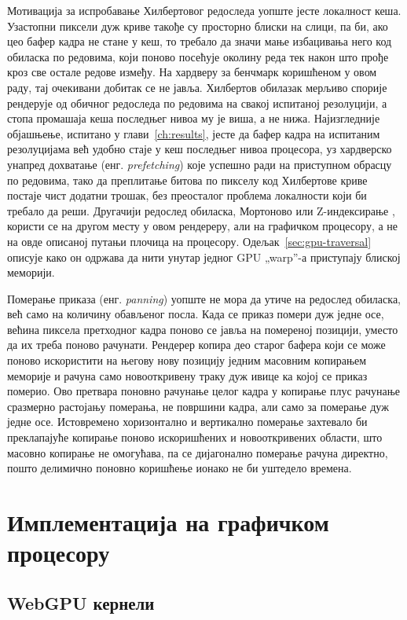 \documentclass[serbian]{ftndiplomski}
\begin{document}
Мотивација за испробавање Хилбертовог редоследа уопште јесте локалност кеша.
Узастопни пиксели дуж криве такође су просторно блиски на слици, па би, ако цео бафер
кадра не стане у кеш, то требало да значи мање избацивања него код обиласка по
редовима, који поново посећује околину реда тек након што прође кроз све остале редове
између. На хардверу за бенчмарк коришћеном у овом раду, тај очекивани добитак се не
јавља. Хилбертов обилазак мерљиво спорије рендерује од обичног редоследа по редовима
на свакој испитаној резолуцији, а стопа промашаја кеша последњег нивоа му је виша, а
не нижа. Најизгледније објашњење, испитано у глави~\ref{ch:results}, јесте да бафер
кадра на испитаним резолуцијама већ удобно стаје у кеш последњег нивоа процесора, уз
хардверско унапред дохватање (енг. \emph{prefetching}) које успешно ради на приступном
обрасцу по редовима, тако да преплитање битова по пикселу код Хилбертове криве постаје
чист додатни трошак, без преосталог проблема локалности који би требало да реши.
Другачији редослед обиласка, Мортоново или Z-индексирање \cite{morton1966}, користи се
на другом месту у овом рендереру, али на графичком процесору, а не на овде описаној
путањи плочица на процесору. Одељак~\ref{sec:gpu-traversal} описује како он одржава да
нити унутар једног GPU „warp''-а приступају блиској меморији.

Померање приказа (енг. \emph{panning}) уопште не мора да утиче на редослед обиласка, већ
само на количину обављеног посла. Када се приказ помери дуж једне осе, већина пиксела
претходног кадра поново се јавља на помереној позицији, уместо да их треба поново
рачунати. Рендерер копира део старог бафера који се може поново искористити на његову
нову позицију једним масовним копирањем меморије и рачуна само новооткривену траку
дуж ивице ка којој се приказ померио. Ово претвара поновно рачунање целог кадра у копирање плус рачунање сразмерно
растојању померања, не површини кадра, али само за померање дуж једне осе.
Истовремено хоризонтално и вертикално померање захтевало би преклапајуће копирање
поново искоришћених и новооткривених области, што масовно копирање не омогућава,
па се дијагонално померање рачуна директно, пошто делимично поновно коришћење
ионако не би уштедело времена.

\chapter{Имплементација на графичком процесору}
\label{ch:gpu}

\section{WebGPU кернели}
\label{sec:webgpu}
\end{document}
